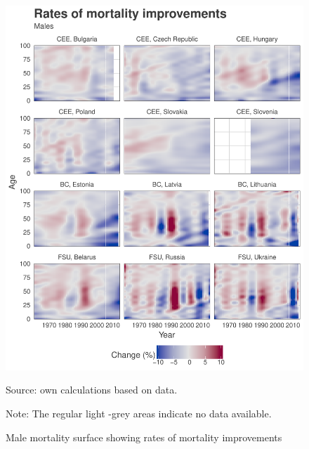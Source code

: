 \documentclass{article}
\begin{document}
\newpage

\begin{figure}[h!]
\caption{Male mortality surface showing rates of mortality improvements}
\label{Fig_ROMI}
\centering
\begin{center}
\includegraphics[scale=.55]{Figures/Romi_males.pdf}
\end{center}
Source: own calculations based on \citet{HMD} data. 
\begin{small}
Note: The regular light -grey areas indicate no data available.
\end{small}
\end{figure}
\end{document}
